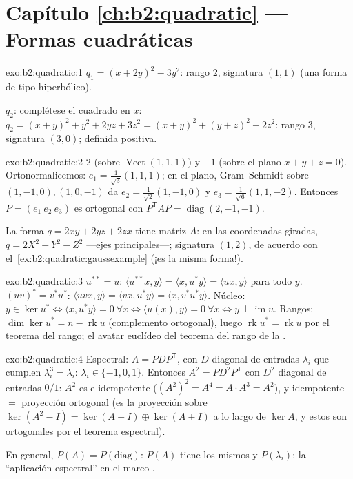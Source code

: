 \section*{Capítulo \ref{ch:b2:quadratic} --- Formas cuadráticas}

\begin{solution}{exo:b2:quadratic:1}
$q_1 = (x + 2y)^2 - 3y^2$: rango $2$, signatura $(1, 1)$ (una forma de
tipo hiperbólico).

$q_2$: complétese el cuadrado en $x$: $q_2 = (x + y)^2 + y^2 + 2yz +
3z^2 = (x+y)^2 + (y + z)^2 + 2z^2$: rango $3$, signatura $(3, 0)$;
definida positiva.
\end{solution}

\begin{solution}{exo:b2:quadratic:2}
 $2$ (sobre $\operatorname{Vect}(1,1,1)$) y $-1$
(sobre el plano $x + y + z = 0$). Ortonormalicemos: $e_1 =
\frac{1}{\sqrt3}(1,1,1)$; en el plano, Gram--Schmidt sobre $(1,-1,0),
(1,0,-1)$ da $e_2 = \frac{1}{\sqrt2}(1,-1,0)$ y $e_3 =
\frac{1}{\sqrt6}(1,1,-2)$. Entonces $P = (e_1\ e_2\ e_3)$ es ortogonal
con $P^{\mathsf T}AP = \operatorname{diag}(2,-1,-1)$.

La forma $q = 2xy + 2yz + 2zx$ tiene matriz $A$: en las coordenadas
giradas, $q = 2X^2 - Y^2 - Z^2$ ---ejes principales---; signatura
$(1,2)$, de acuerdo con el~\cref{ex:b2:quadratic:gaussexample} (¡es la
misma forma!).
\end{solution}

\begin{solution}{exo:b2:quadratic:3}
$u^{**} = u$: $\langle u^{**}x, y\rangle = \langle x, u^*y\rangle =
\langle ux, y\rangle$ para todo $y$. $(uv)^* = v^*u^*$: $\langle uvx,
y\rangle = \langle vx, u^*y\rangle = \langle x, v^*u^*y\rangle$.
Núcleo: $y \in \ker u^* \iff \langle x, u^*y \rangle = 0\ \forall x
\iff \langle u(x), y\rangle = 0\ \forall x \iff y \perp
\operatorname{im} u$. Rangos: $\dim\ker u^* = n - \operatorname{rk} u$
(complemento ortogonal), luego $\operatorname{rk} u^* =
\operatorname{rk} u$ por el teorema del rango; el avatar euclídeo del
teorema del rango de la .
\end{solution}

\begin{solution}{exo:b2:quadratic:4}
Espectral: $A = PDP^{\mathsf T}$, con $D$ diagonal de entradas
$\lambda_i$ que cumplen $\lambda_i^3 = \lambda_i$: $\lambda_i \in \{-1,
0, 1\}$. Entonces $A^2 = PD^2P^{\mathsf T}$ con $D^2$ diagonal de
entradas $0/1$: $A^2$ es  e idempotente ($(A^2)^2 = A^4 =
A\cdot A^3 = A^2$), y  idempotente $=$ proyección ortogonal
(es la proyección sobre $\ker(A^2 - I) = \ker(A-I)\oplus\ker(A+I)$ a lo
largo de $\ker A$, y estos son ortogonales por el teorema espectral).

En general, $P(A) = P\!\left(\text{diag}\right)$: $P(A)$ tiene los
mismos  y  $P(\lambda_i)$; la
``aplicación espectral'' en el marco .
\end{solution}

